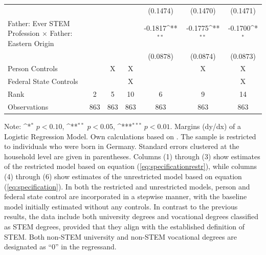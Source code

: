 \documentclass[a4paper, oneside, hyperfootnotes = false]{article}
\def\sym#1{\ifmmode^{#1}\else\(^{#1}\)\fi}
\begin{document}
{\begin{landscape}
\begin{table}[ht]
\begin{center}
{\begin{tabular}{l*{6}{c}}
					&                     &                     &                     &    (0.1474)         &    (0.1470)         &    (0.1471)         \\
					\addlinespace
					Father: Ever STEM Profession $\times$ Father: Eastern Origin&                     &                     &                     &     -0.1817\sym{**} &     -0.1775\sym{**} &     -0.1700\sym{*}  \\
					&                     &                     &                     &    (0.0878)         &    (0.0874)         &    (0.0873)         \\
					\midrule
					Person Controls & & X  & X & & X & X \\
					Federal State Controls & & & X & & & X \\
					Rank                &      2         &      5         &     10         &      6         &      9         &     14         \\
					Observations &    863         &    863         &    863         &    863         &    863         &    863         \\
					\bottomrule
			\end{tabular}}
			
			\vspace{2mm}
			
			\parbox{15cm}{
				\linespread{1}\footnotesize Note: \sym{*} \(p<0.10\), \sym{**} \(p<0.05\), \sym{***} \(p<0.01\). Margins (dy/dx) of a Logistic Regression Model. Own calculations based on \cite{SOEP2023}. The sample is restricted to individuals who were born in Germany. Standard errors clustered at the household level are given in parentheses. Columns (1) through (3) show estimates of the restricted model based on equation (\ref{eq:specificationrestr}), while columns (4) through (6) show estimates of the unrestricted model based on equation (\ref{eq:specification}). In both the restricted and unrestricted models, person and federal state control are incorporated in a stepwise manner, with the baseline model initially estimated without any controls. In contrast to the previous results, the data include both university degrees and vocational degrees classified as STEM degrees, provided that they align with the established definition of STEM. Both non-STEM university and non-STEM vocational degrees are designated as ``0'' in the regressand.}
			
		\end{center}
	\end{table}
\end{landscape}

}
\end{document}
